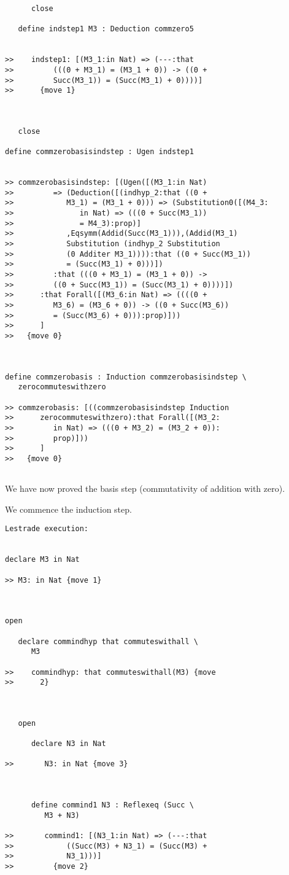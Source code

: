 \documentclass[12pt]{article}
\begin{document}
\begin{verbatim}
      close

   define indstep1 M3 : Deduction commzero5


>>    indstep1: [(M3_1:in Nat) => (---:that
>>         (((0 + M3_1) = (M3_1 + 0)) -> ((0 +
>>         Succ(M3_1)) = (Succ(M3_1) + 0))))]
>>      {move 1}



   close

define commzerobasisindstep : Ugen indstep1


>> commzerobasisindstep: [(Ugen([(M3_1:in Nat)
>>         => (Deduction([(indhyp_2:that ((0 +
>>            M3_1) = (M3_1 + 0))) => (Substitution0([(M4_3:
>>               in Nat) => (((0 + Succ(M3_1))
>>               = M4_3):prop)]
>>            ,Eqsymm(Addid(Succ(M3_1))),(Addid(M3_1)
>>            Substitution (indhyp_2 Substitution
>>            (0 Additer M3_1)))):that ((0 + Succ(M3_1))
>>            = (Succ(M3_1) + 0)))])
>>         :that (((0 + M3_1) = (M3_1 + 0)) ->
>>         ((0 + Succ(M3_1)) = (Succ(M3_1) + 0))))])
>>      :that Forall([(M3_6:in Nat) => ((((0 +
>>         M3_6) = (M3_6 + 0)) -> ((0 + Succ(M3_6))
>>         = (Succ(M3_6) + 0))):prop)]))
>>      ]
>>   {move 0}



define commzerobasis : Induction commzerobasisindstep \
   zerocommuteswithzero

>> commzerobasis: [((commzerobasisindstep Induction
>>      zerocommuteswithzero):that Forall([(M3_2:
>>         in Nat) => (((0 + M3_2) = (M3_2 + 0)):
>>         prop)]))
>>      ]
>>   {move 0}


\end{verbatim}

We have now proved the basis step (commutativity of addition with zero).

We commence the induction step.

\begin{verbatim}Lestrade execution:


declare M3 in Nat

>> M3: in Nat {move 1}



open

   declare commindhyp that commuteswithall \
      M3

>>    commindhyp: that commuteswithall(M3) {move
>>      2}



   open

      declare N3 in Nat

>>       N3: in Nat {move 3}



      define commind1 N3 : Reflexeq (Succ \
         M3 + N3)

>>       commind1: [(N3_1:in Nat) => (---:that
>>            ((Succ(M3) + N3_1) = (Succ(M3) +
>>            N3_1)))]
>>         {move 2}


\end{verbatim}
\end{document}
